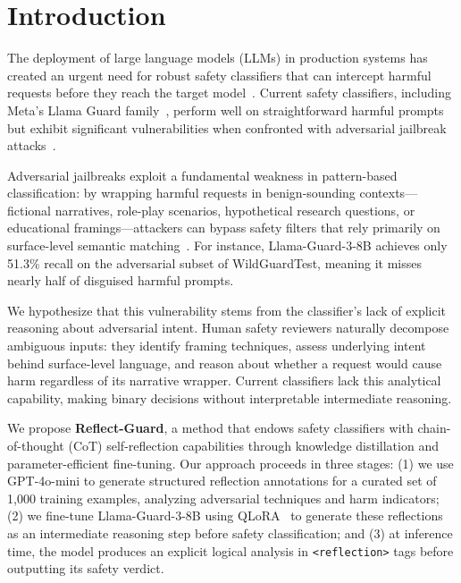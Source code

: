 \documentclass[ai,article,submit,pdftex,moreauthors]{Definitions/mdpi}
\begin{document}

\section{Introduction}

The deployment of large language models (LLMs) in production systems has created an urgent need for robust safety classifiers that can intercept harmful requests before they reach the target model~\citep{inan2023llamaguard, han2024wildguard}. Current safety classifiers, including Meta's Llama Guard family~\citep{inan2023llamaguard, metallamaguard3}, perform well on straightforward harmful prompts but exhibit significant vulnerabilities when confronted with adversarial jailbreak attacks~\citep{chao2023jailbreaking, zou2023universal, liu2024autodan}.

Adversarial jailbreaks exploit a fundamental weakness in pattern-based classification: by wrapping harmful requests in benign-sounding contexts---fictional narratives, role-play scenarios, hypothetical research questions, or educational framings---attackers can bypass safety filters that rely primarily on surface-level semantic matching~\citep{wei2024jailbroken}. For instance, Llama-Guard-3-8B achieves only 51.3\% recall on the adversarial subset of WildGuardTest, meaning it misses nearly half of disguised harmful prompts.

We hypothesize that this vulnerability stems from the classifier's lack of explicit reasoning about adversarial intent. Human safety reviewers naturally decompose ambiguous inputs: they identify framing techniques, assess underlying intent behind surface-level language, and reason about whether a request would cause harm regardless of its narrative wrapper. Current classifiers lack this analytical capability, making binary decisions without interpretable intermediate reasoning.

We propose \textbf{Reflect-Guard}, a method that endows safety classifiers with chain-of-thought (CoT) self-reflection capabilities through knowledge distillation and parameter-efficient fine-tuning. Our approach proceeds in three stages: (1) we use GPT-4o-mini to generate structured reflection annotations for a curated set of 1{,}000 training examples, analyzing adversarial techniques and harm indicators; (2) we fine-tune Llama-Guard-3-8B using QLoRA~\citep{dettmers2024qlora} to generate these reflections as an intermediate reasoning step before safety classification; and (3) at inference time, the model produces an explicit logical analysis in \texttt{<reflection>} tags before outputting its safety verdict.
\end{document}

